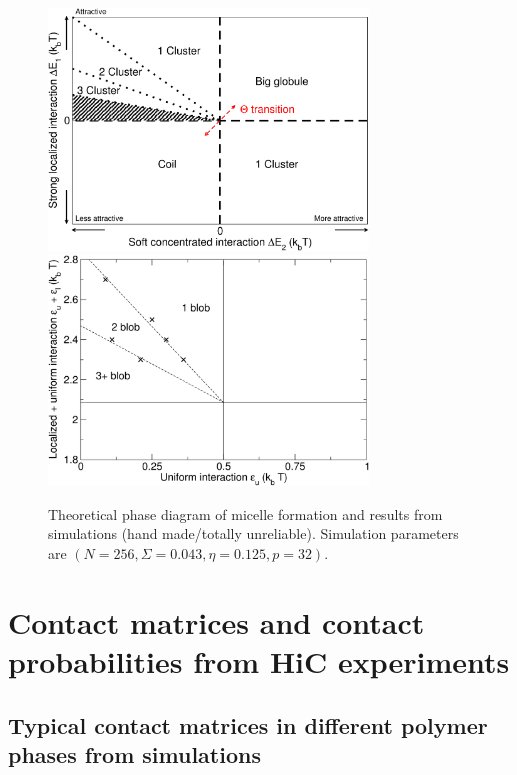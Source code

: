 \documentclass[12pt,a4paper,notitlepage]{article}
\begin{document}
\begin{figure}[h!]
\centering
\includegraphics[width=8.5cm]{local_phases}\includegraphics[width=8.5cm]{zexpclust}\\
\caption{Theoretical phase diagram of micelle formation and results
  from simulations (hand made/totally unreliable). Simulation
  parameters are $(N=256, \Sigma=0.043, \eta=0.125, p=32)$.
} 
\label{fig:locphases}
\end{figure}


\FloatBarrier

\section{Contact matrices and contact probabilities from HiC experiments} 

\subsection{Typical contact matrices in different polymer phases from
            simulations}
\end{document}
